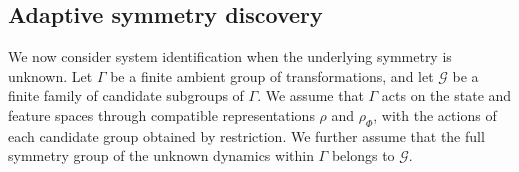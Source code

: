 \documentclass[11pt]{article}
\theoremstyle{plain}
\theoremstyle{definition}
\theoremstyle{remark}
\begin{document}







 
\subsection{Adaptive symmetry discovery}
\label{sec:adaptive}

 
We now consider system identification when the underlying symmetry is unknown.
Let \(\Gamma\) be a finite ambient group of transformations, and let
\(\mathcal G\) be a finite family of candidate subgroups of \(\Gamma\). We
assume that \(\Gamma\) acts on the state and feature spaces through compatible
representations \(\rho\) and \(\rho_\Phi\), with the actions of each candidate
group obtained by restriction. We further assume that the full symmetry group
of the unknown dynamics within \(\Gamma\) belongs to \(\mathcal G\).
 
\end{document}
